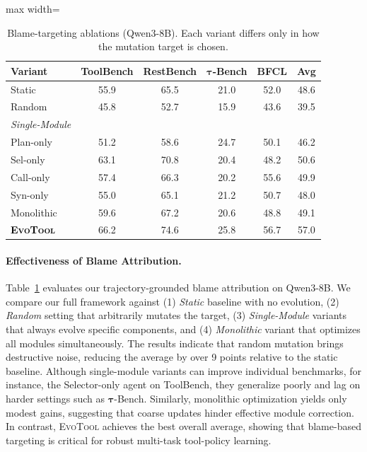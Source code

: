\documentclass[11pt]{article}
\begin{document}
\begin{table}[t]
\centering
\small
\setlength{\tabcolsep}{2.5pt}
\begin{adjustbox}{max width=\columnwidth}
\begin{tabular}{l c c c c |c}
\toprule
\textbf{Variant} & \textbf{ToolBench} & \textbf{RestBench} & \boldmath$\bm{\tau}$\textbf{-Bench} & \textbf{BFCL} & \textbf{Avg} \\
\midrule
Static & 55.9 & 65.5 & 21.0 & 52.0 & 48.6 \\
Random & 45.8 & 52.7 & 15.9 & 43.6 & 39.5 \\
\midrule
\textit{Single-Module} \\
\quad Plan-only & 51.2 & 58.6 & 24.7 & 50.1 & 46.2 \\
\quad Sel-only  & 63.1 & 70.8 & 20.4 & 48.2 & 50.6 \\
\quad Call-only & 57.4 & 66.3 & 20.2 & 55.6 & 49.9 \\
\quad Syn-only  & 55.0 & 65.1 & 21.2 & 50.7 & 48.0 \\
\midrule
Monolithic & 59.6 & 67.2 & 20.6 & 48.8 & 49.1 \\
\midrule
\textbf{\textcolor{black}{\textsc{EvoTool}}} & 66.2 & 74.6 & 25.8 & 56.7 & 57.0 \\
\bottomrule
\end{tabular}
\end{adjustbox}
\vspace{-0.3em}
\caption{Blame-targeting ablations (Qwen3-8B). Each variant differs only in how the mutation target is chosen.}
\vspace{-0.5em}
\label{tab:blame_ablation}
\end{table}


\paragraph{Effectiveness of Blame Attribution.} Table~\ref{tab:blame_ablation} evaluates our trajectory-grounded blame attribution on Qwen3-8B. We compare our full framework against (1) \textit{Static} baseline with no evolution, (2) \textit{Random} setting that arbitrarily mutates the target, (3) \textit{Single-Module} variants that always evolve specific components, and (4) \textit{Monolithic} variant that optimizes all modules simultaneously. The results indicate that random mutation brings destructive noise, reducing the average by over 9 points relative to the static baseline. Although single-module variants can improve individual benchmarks, for instance, the Selector-only agent on ToolBench, they generalize poorly and lag on harder settings such as $\bm{\tau}$-Bench. Similarly, monolithic optimization yields only modest gains, suggesting that coarse updates hinder effective module correction. In contrast, \textsc{EvoTool} achieves the best overall average, showing that blame-based targeting is critical for robust multi-task tool-policy learning.
\end{document}
